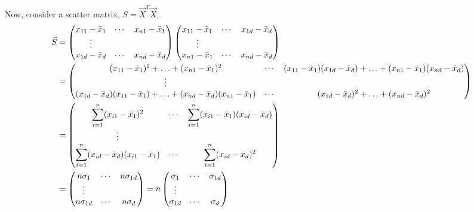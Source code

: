 \documentclass{article}
\begin{document}
Now, consider a scatter matrix, $S = \Vec{X}^T \Vec{X}$,
\begin{align}
    \Vec{S} &= 
    \begin{pmatrix}
    x_{11} - \Bar{x}_1 & \cdots & x_{n1} - \Bar{x}_1 \\
    \vdots \\
    x_{1d} - \Bar{x}_d & \cdots & x_{nd} - \Bar{x}_d \\
    \end{pmatrix}
    \begin{pmatrix}
    x_{11} - \Bar{x}_1 & \cdots & x_{1d} - \Bar{x}_d \\
    \vdots \\
    x_{n1} - \Bar{x}_1 & \cdots & x_{nd} - \Bar{x}_d \\
    \end{pmatrix} \nonumber \\
    &=
    \begin{pmatrix}
    (x_{11}-\Bar{x}_1)^2 + \dotsc + (x_{n1}-\Bar{x}_1)^2
    & \cdots &
    (x_{11}-\Bar{x}_1)(x_{1d}-\Bar{x}_d) + \dotsc +
    (x_{n1}-\Bar{x}_1)(x_{nd}-\Bar{x}_d) \\
    \vdots \\
    (x_{1d}-\Bar{x}_d)(x_{11}-\Bar{x}_1) + \dotsc +
    (x_{nd}-\Bar{x}_d)(x_{n1}-\Bar{x}_1)
    & \cdots &
    (x_{1d}-\Bar{x}_d)^2 + \dotsc + (x_{nd}-\Bar{x}_d)^2
    \end{pmatrix} \nonumber \\
    &=
    \begin{pmatrix}
    \displaystyle\sum_{i=1}^{n} (x_{i1}-\Bar{x}_1)^2
    & \cdots &
    \displaystyle\sum_{i=1}^{n} (x_{i1}-\Bar{x}_1)(x_{id}-\Bar{x}_d)\\
    \vdots \\
    \displaystyle\sum_{i=1}^{n} (x_{id}-\Bar{x}_d)(x_{i1}-\Bar{x}_1)
    & \cdots &
    \displaystyle\sum_{i=1}^{n} (x_{id}-\Bar{x}_d)^2 
    \end{pmatrix} \nonumber \\
    &=
    \begin{pmatrix}
    n\sigma_{1} & \cdots & n\sigma_{1d} \\
    \vdots \\
    n\sigma_{1d} & \cdots & n\sigma_{d}
    \end{pmatrix} 
    = n     \begin{pmatrix}
    \sigma_{1} & \cdots & \sigma_{1d} \\
    \vdots \\
    \sigma_{1d} & \cdots & \sigma_{d}
    \end{pmatrix} 
\end{align}
\end{document}
